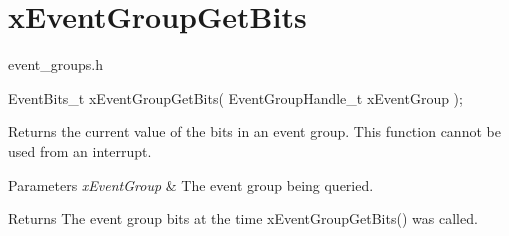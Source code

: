 \hypertarget{group__xEventGroupGetBits}{}\section{x\+Event\+Group\+Get\+Bits}
\label{group__xEventGroupGetBits}
event\+\_\+groups.\+h 
\begin{DoxyPre}
   EventBits\_t xEventGroupGetBits( EventGroupHandle\_t xEventGroup );
\end{DoxyPre}


Returns the current value of the bits in an event group. This function cannot be used from an interrupt.


\begin{DoxyParams}{Parameters}
{\em x\+Event\+Group} & The event group being queried.\\
\hline
\end{DoxyParams}
\begin{DoxyReturn}{Returns}
The event group bits at the time x\+Event\+Group\+Get\+Bits() was called. 
\end{DoxyReturn}
